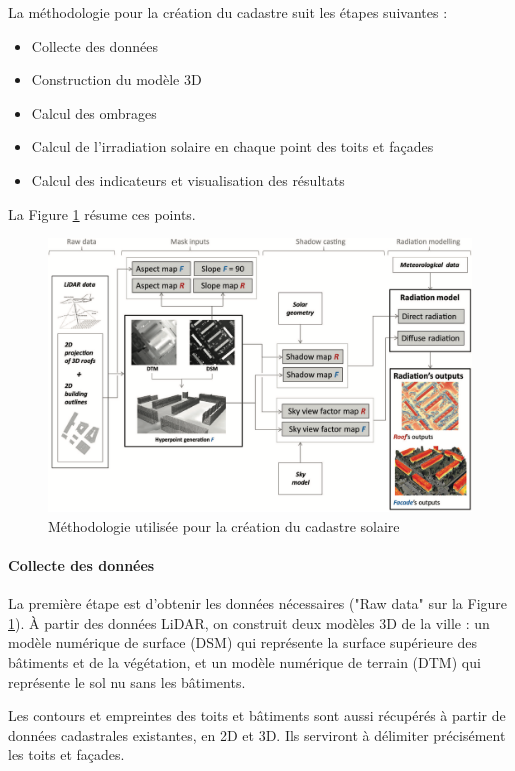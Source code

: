 La méthodologie \cite{desthieux_solar_2018} pour la création du cadastre suit les étapes suivantes :
\begin{itemize}
    \item Collecte des données
    \item Construction du modèle 3D
    \item Calcul des ombrages
    \item Calcul de l'irradiation solaire en chaque point des toits et façades
    \item Calcul des indicateurs et visualisation des résultats
\end{itemize}

La Figure \ref{fig:cadastre_solaire_methodologie} résume ces points.
\begin{figure}[H]
    \centering
    \includegraphics[width=1\linewidth]{02-main//figures/cadastre_solaire_methodologie.png}
    \caption{Méthodologie utilisée pour la création du cadastre solaire \cite{desthieux_solar_2018}}
    \label{fig:cadastre_solaire_methodologie}
\end{figure}

\paragraph{Collecte des données}
\par{La première étape est d'obtenir les données nécessaires ("Raw data" sur la Figure \ref{fig:cadastre_solaire_methodologie}). À partir des données LiDAR, on construit deux modèles 3D de la ville : un modèle numérique de surface (DSM) qui représente la surface supérieure des bâtiments et de la végétation, et un modèle numérique de terrain (DTM) qui représente le sol nu sans les bâtiments.}
\par{Les contours et empreintes des toits et bâtiments  sont aussi récupérés à partir de données cadastrales existantes, en 2D et 3D. Ils serviront à délimiter précisément les toits et façades.}

